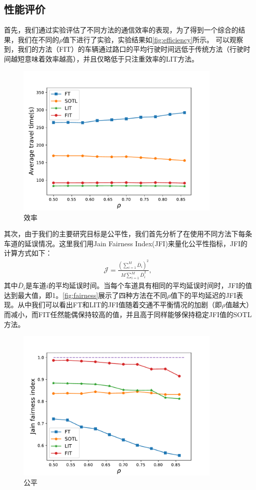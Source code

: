 \subsection{性能评价}
首先，我们通过实验评估了不同方法的通信效率的表现，为了得到一个综合的结果，我们在不同的$\rho$值下进行了实验，实验结果如\autoref{fig:efficiency}所示。
可以观察到，我们的方法（FIT）的车辆通过路口的平均行驶时间远低于传统方法（行驶时间越短意味着效率越高），并且仅略低于只注重效率的LIT方法。
\begin{figure}[htb]
    \includegraphics[width=10cm]{fig/efficiency.pdf}
    \caption{效率}
    \label{fig:efficiency}
\end{figure}

其次，由于我们的主要研究目标是公平性，我们首先分析了在使用不同方法下每条车道的延误情况。这里我们用Jain Fairness Index(JFI)来量化公平性指标，JFI的计算方式如下：
\begin{align}
    \mathcal{J}=\frac{\left(\sum_{i=1}^{M} \bar{D}_{i}\right)^{2}}{M \sum_{i=1}^{M} \bar{D}_{i}^{2}},
\end{align}
其中$\bar{D}_{i}$是车道$i$的平均延误时间。当每个车道具有相同的平均延误时间时，JFI的值达到最大值，即1。\autoref{fig:fairness}展示了四种方法在不同$\rho$值下的平均延迟的JFI表现。从中我们可以看出FT和LIT的JFI值随着交通不平衡情况的加剧（即$\rho$值越大）而减小，而FIT任然能偶保持较高的值，并且高于同样能够保持稳定JFI值的SOTL方法。
\begin{figure}[htb]
    \includegraphics[width=10cm]{fig/fairness.pdf}
    \caption{公平}
    \label{fig:fairness}
\end{figure}

